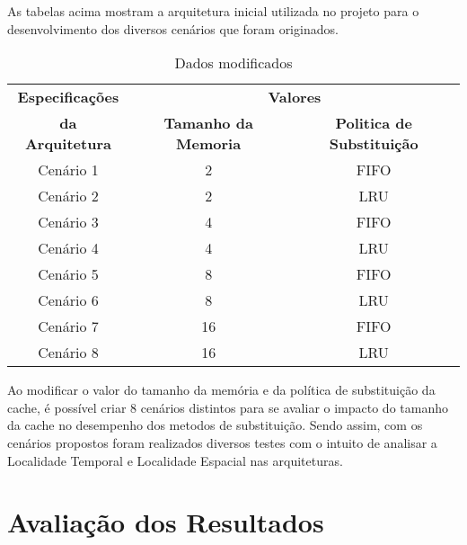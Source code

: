 \documentclass[conference]{IEEEtran}
\begin{document}
As tabelas acima mostram a arquitetura inicial utilizada no projeto para o desenvolvimento dos diversos 
cenários que foram originados.    

\begin{table}[H]
  \caption{Dados modificados}
  \begin{center}
      \begin{tabular}{|c|c|c|}
          \hline
          \textbf{Especificações} & \multicolumn{2}{|c|}{\textbf{Valores}} \\
          \cline{2-3} 
          \textbf{da Arquitetura} & \textbf{Tamanho da Memoria} & \textbf{Politica de Substituição} \\
          \hline
          Cenário 1 & 2 & FIFO \\
          \hline
          Cenário 2 & 2 & LRU \\
          \hline
          Cenário 3 & 4 & FIFO\\
          \hline
          Cenário 4 & 4 & LRU\\
          \hline
          Cenário 5 & 8 & FIFO\\
          \hline
          Cenário 6 & 8 & LRU\\
          \hline
          Cenário 7 & 16 & FIFO\\
          \hline
          Cenário 8 & 16 & LRU\\
          \hline
      \end{tabular}
      \label{tab1}
  \end{center}
\end{table}

Ao modificar o valor do tamanho da memória e da política de substituição da cache, é possível criar 8 cenários distintos
para se avaliar o impacto do tamanho da cache no desempenho dos metodos de substituição. Sendo assim, com os cenários propostos
foram realizados diversos testes com o intuito de analisar a Localidade Temporal e Localidade Espacial nas arquiteturas.

\section{Avaliação dos Resultados}

\end{document}
